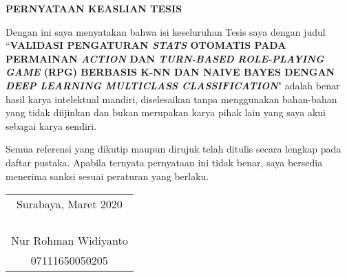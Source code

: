 \begin{center}
\Large\textbf{PERNYATAAN KEASLIAN TESIS}
\end{center}
\vspace{1ex}
\begin{spacing}{1.5}

\setlength{\parindent}{0.9cm} Dengan ini saya menyatakan bahwa isi keseluruhan Tesis saya dengan judul ``\textbf{VALIDASI PENGATURAN \textit{STATS} OTOMATIS PADA PERMAINAN \textit{ACTION} DAN \textit{TURN-BASED} \textit{ROLE-PLAYING GAME} (RPG) BERBASIS K-NN DAN NAIVE BAYES DENGAN \textit{DEEP LEARNING MULTICLASS CLASSIFICATION}}" adalah benar hasil karya intelektual mandiri, diselesaikan tanpa menggunakan bahan-bahan yang tidak diijinkan dan bukan merupakan karya pihak lain yang saya akui sebagai karya sendiri.
\vspace{1ex}

Semua referensi yang dikutip maupun dirujuk telah ditulis secara lengkap pada daftar pustaka. Apabila ternyata pernyataan ini tidak benar, saya bersedia menerima sanksi sesuai peraturan yang berlaku.
\vspace{1ex}
\end{spacing}
\begin{flushright}
\begin{tabular}[b]{c}
  Surabaya, Maret 2020\\
  \\
  \\
  \\
  \\
  Nur Rohman Widiyanto\\
  07111650050205
\end{tabular}
\end{flushright}